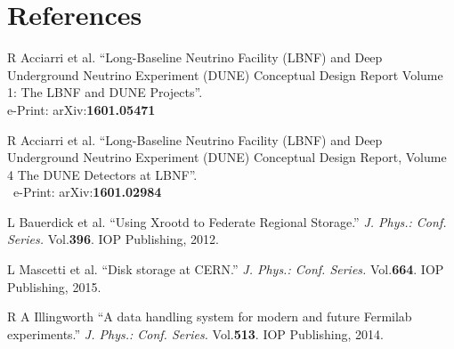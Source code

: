 \documentclass[pdftex,12pt,letter]{article}
\begin{document}
\clearpage

\section*{References}
\begin{thebibliography}{9}

R Acciarri et al.
``Long-Baseline Neutrino Facility (LBNF) and Deep Underground Neutrino Experiment (DUNE) Conceptual Design Report Volume 1: The LBNF and DUNE Projects''.\\ e-Print: arXiv:\textbf{1601.05471}

R Acciarri et al.
``Long-Baseline Neutrino Facility (LBNF) and Deep Underground Neutrino Experiment (DUNE) Conceptual Design Report, Volume 4 The DUNE Detectors at LBNF''.\\~e-Print: arXiv:\textbf{1601.02984}


L Bauerdick et al. ``Using Xrootd to Federate Regional Storage.'' \textit{J. Phys.: Conf. Series.} Vol.\textbf{396}. IOP Publishing, 2012.



 L Mascetti et al. ``Disk storage at CERN.'' \textit{J. Phys.: Conf. Series.} Vol.\textbf{664}. IOP Publishing, 2015.



R A Illingworth ``A data handling system for modern and future Fermilab experiments.''  \textit{J. Phys.: Conf. Series.} Vol.\textbf{513}. IOP Publishing, 2014.



\end{thebibliography}
\end{document}
